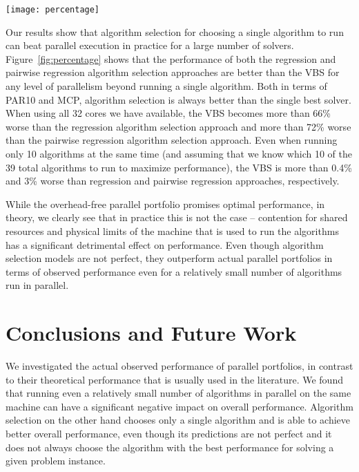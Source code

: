 \begin{figure*}
    \setlength{\parindent}{0pt}
    \centering
    \texttt{[image: percentage]}
    \small 
    \caption[PAR10 Score Increase with More Parallel Runs]{Percentage increase in terms of PAR10 score for running different numbers of algorithms in parallel compared to algorithm selector performance for choosing a single algorithm. For example, an increase of 100\% means that running the algorithms in parallel doubles the PAR10 score over selecting a single algorithm.}
    \label{fig:percentage}
\end{figure*}

Our results show that algorithm selection for choosing a single algorithm to run can beat parallel execution in practice for a large number of solvers. Figure~\ref{fig:percentage} shows that the performance of both the regression and pairwise regression algorithm selection approaches are better than the VBS for any level of parallelism beyond running a single algorithm. Both in terms of PAR10 and MCP, algorithm selection is always better than the single best solver. When using all 32 cores we have available, the VBS becomes more than 66\% worse than the regression algorithm selection approach and more than 72\% worse than
the pairwise regression algorithm selection approach. Even when running only 10 algorithms at the same time (and assuming that we know which 10 of the 39 total algorithms to run to maximize performance), the VBS is more than 0.4\% and 3\% worse than regression and pairwise regression approaches, respectively.

While the overhead-free parallel portfolio promises optimal performance, in theory, we clearly see that in practice this is not the case -- contention for shared resources and physical limits of the machine that is used to run the algorithms has a significant detrimental effect on performance. Even though algorithm selection models are not perfect, they outperform actual parallel portfolios in terms of observed performance even for a relatively small number of algorithms run in parallel.

\section{Conclusions and Future Work}

We investigated the actual observed performance of parallel
portfolios, in contrast to their theoretical performance that is usually used in the literature. We found that running even a relatively small number of
algorithms in parallel on the same machine can have a significant negative
impact on overall performance. Algorithm selection on the other hand chooses only a single algorithm and is able to achieve better overall performance, even though its predictions are not perfect and it does not always choose the algorithm with the best performance for solving a given problem instance.


